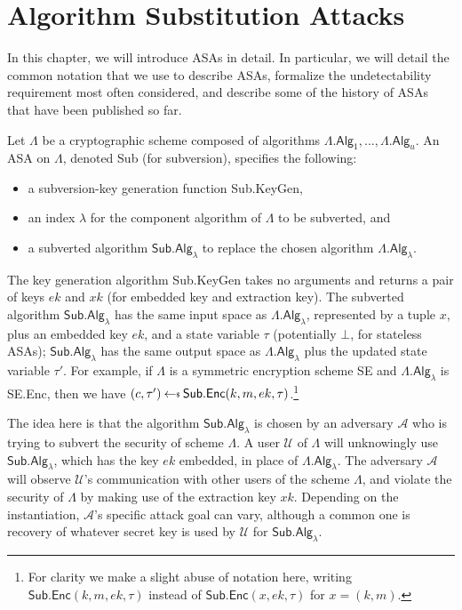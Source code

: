\chapter{Algorithm Substitution Attacks} \label{sec:ASA}

In this chapter, we will introduce ASAs in detail. In particular, we will detail the common notation that we use to describe ASAs, formalize the undetectability requirement most often considered, and describe some of the history of ASAs that have been published so far.

Let $\mathsf{\Lambda}$ be a cryptographic scheme composed of algorithms $\mathsf{\Lambda.Alg}_1,..., \mathsf{\Lambda.Alg}_u$. An ASA on $\mathsf{\Lambda}$, denoted \textsf{Sub} (for subversion), specifies the following:
\begin{itemize}
\item a subversion-key generation function \textsf{Sub.KeyGen},
\item an index $\lambda$ for the component algorithm of $\mathsf{\Lambda}$ to be subverted, and
\item a subverted algorithm $\mathsf{Sub.Alg}_\lambda$ to replace the chosen algorithm $\mathsf{\Lambda.Alg}_\lambda$.
\end{itemize}

The key generation algorithm \textsf{Sub.KeyGen} takes no arguments and returns a pair of keys $ek$ and $xk$ (for embedded key and extraction key). The subverted algorithm $\mathsf{Sub.Alg}_\lambda$ has the same input space as $\mathsf{\Lambda.Alg}_\lambda$, represented by a tuple $x$, plus an embedded key $ek$, and a state variable $\tau$ (potentially $\bot$, for stateless ASAs); $\mathsf{Sub.Alg}_\lambda$ has the same output space as $\mathsf{\Lambda.Alg}_\lambda$ plus the updated state variable $\tau'$. For example, if $\mathsf{\Lambda}$ is a symmetric encryption scheme \textsf{SE} and $\mathsf{\Lambda.Alg}_\lambda$ is \textsf{SE.Enc}, then we have $(c, \tau') \sample \mathsf{Sub.Enc}(k, m, ek, \tau)$.\footnote{For clarity we make a slight abuse of notation here, writing $\mathsf{Sub.Enc}(k, m, ek, \tau)$ instead of $\mathsf{Sub.Enc}(x, ek, \tau)$ for $x=(k, m)$.}

The idea here is that the algorithm $\mathsf{Sub.Alg}_\lambda$ is chosen by an adversary $\mathcal{A}$ who is trying to subvert the security of scheme $\mathsf{\Lambda}$. A user $\mathcal{U}$ of $\mathsf{\Lambda}$ will unknowingly use $\mathsf{Sub.Alg}_\lambda$, which has the key $ek$ embedded, in place of $\mathsf{\Lambda.Alg}_\lambda$. The adversary $\mathcal{A}$ will observe $\mathcal{U}$'s communication with other users of the scheme $\mathsf{\Lambda}$, and violate the security of $\mathsf{\Lambda}$ by making use of the extraction key $xk$. Depending on the instantiation, $\mathcal{A}$'s specific attack goal can vary, although a common one is recovery of whatever secret key is used by $\mathcal{U}$ for $\mathsf{Sub.Alg}_\lambda$.

